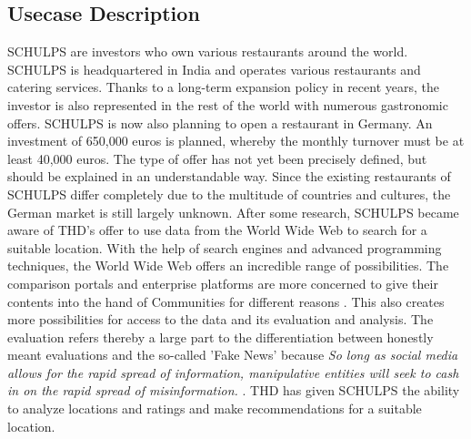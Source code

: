 \subsection{Usecase Description}
\label{subsec:usecase}
SCHULPS are investors who own various restaurants around the world. SCHULPS is headquartered in India and operates various restaurants and catering services. Thanks to a long-term expansion policy in recent years, the investor is also represented in the rest of the world with numerous gastronomic offers. SCHULPS is now also planning to open a restaurant in Germany. An investment of 650,000 euros is planned, whereby the monthly turnover must be at least 40,000 euros. The type of offer has not yet been precisely defined, but should be explained in an understandable way. Since the existing restaurants of SCHULPS differ completely due to the multitude of countries and cultures, the German market is still largely unknown. After some research, SCHULPS became aware of THD's offer to use data from the World Wide Web to search for a suitable location. With the help of search engines and advanced programming techniques, the World Wide Web offers an incredible range of possibilities. The comparison portals and enterprise platforms are more concerned to give their contents into the hand of Communities for different reasons \cite{socialbusiness}. This also creates more possibilities for access to the data and its evaluation and analysis. The evaluation refers thereby a large part to the differentiation between honestly meant evaluations and the so-called 'Fake News' because \textit{So long as social media allows for the rapid spread of information, manipulative entities will seek to cash in on the rapid spread of misinformation.} \cite{fakenews}.
THD has given SCHULPS the ability to analyze locations and ratings and make recommendations for a suitable location.
